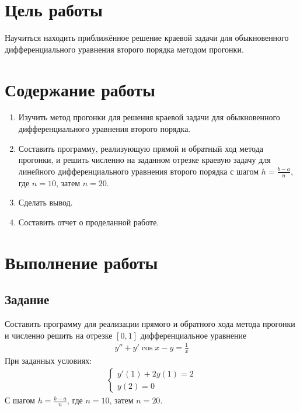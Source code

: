 \section{Цель работы}
Научиться находить приближённое решение краевой задачи для обыкновенного дифференциального уравнения второго порядка методом прогонки.

\section{Содержание работы}
\begin{enumerate}
	\item Изучить метод прогонки для решения краевой задачи для обыкновенного дифференциального уравнения второго порядка.
	\item Составить программу, реализующую прямой и обратный ход метода прогонки, и решить численно на заданном отрезке краевую задачу для линейного дифференциального уравнения второго порядка с шагом \(h=\frac{b-a}{n}\), где \(n = 10\), затем \(n=20\).
	\item Сделать вывод.
	\item Составить отчет о проделанной работе.
\end{enumerate}

\section{Выполнение работы}
\subsection{Задание}
Составить программу для реализации прямого и обратного хода метода прогонки и численно решить на отрезке \([0,1]\) дифференциальное уравнение
\begin{align}
	y'' + y' \cos x - y = \frac{1}{x}
\end{align}
При заданных условиях:
\begin{align}
	\begin{cases}
		y'(1)+2y(1) = 2 \\
		y(2)        = 0
	\end{cases}
\end{align}
С шагом \(h=\frac{b-a}{n}\), где \(n = 10\), затем \(n=20\).
